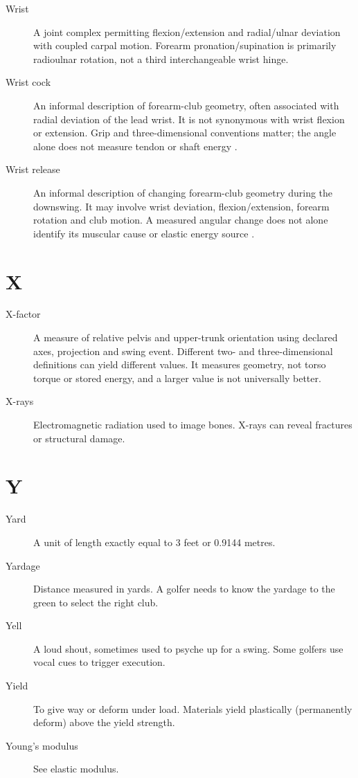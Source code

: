 \begin{description}
\item[Wrist] A joint complex permitting flexion/extension and radial/ulnar deviation with coupled carpal motion. Forearm pronation/supination is primarily radioulnar rotation, not a third interchangeable wrist hinge.

\item[Wrist cock] An informal description of forearm-club geometry, often associated with radial deviation of the lead wrist. It is not synonymous with wrist flexion or extension. Grip and three-dimensional conventions matter; the angle alone does not measure tendon or shaft energy \citep{glossaryWrist2019}.

\item[Wrist release] An informal description of changing forearm-club geometry during the downswing. It may involve wrist deviation, flexion/extension, forearm rotation and club motion. A measured angular change does not alone identify its muscular cause or elastic energy source \citep{glossaryWrist2019}.

\end{description}
\section*{X}
\begin{description}

\item[X-factor] A measure of relative pelvis and upper-trunk orientation using declared axes, projection and swing event. Different two- and three-dimensional definitions can yield different values. It measures geometry, not torso torque or stored energy, and a larger value is not universally better.

\item[X-rays] Electromagnetic radiation used to image bones. X-rays can reveal fractures or structural damage.

\end{description}
\section*{Y}
\begin{description}

\item[Yard] A unit of length exactly equal to 3 feet or 0.9144 metres.

\item[Yardage] Distance measured in yards. A golfer needs to know the yardage to the green to select the right club.

\item[Yell] A loud shout, sometimes used to psyche up for a swing. Some golfers use vocal cues to trigger execution.

\item[Yield] To give way or deform under load. Materials yield plastically (permanently deform) above the yield strength.

\item[Young's modulus] See elastic modulus.

\end{description}
